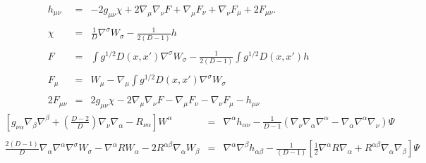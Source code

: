 \documentclass[10pt,letterpaper]{article}
\numberwithin{equation}{section}
\begin{document}
\begin{eqnarray}
h_{\mu\nu} &=& -2g_{\mu\nu}\chi + 2\nabla_\mu\nabla_\nu F + \nabla_\mu F_\nu + \nabla_\nu F_\mu + 2F_{\mu\nu}.
\\ \nonumber\\
\chi &=& \frac{1}{D}\nabla^\sigma W_{\sigma}  - \frac{1}{2(D-1)}h
\\ \nonumber\\
F &=& \int g^{1/2} D(x,x') \nabla^\sigma W_{\sigma}  - \frac{1}{2(D-1)}\int g^{1/2} D(x,x') h
\\ \nonumber\\
F_{\mu} &=& W_{\mu} -\nabla_\mu \int g^{1/2} D(x,x')\nabla^{\sigma}W_\sigma
\\ \nonumber\\
2F_{\mu\nu} &=& 2g_{\mu\nu}\chi - 2\nabla_\mu\nabla_\nu F - \nabla_\mu F_\nu - \nabla_\nu F_{\mu} - h_{\mu\nu} 
\end{eqnarray}
\begin{eqnarray}
\left[g_{\nu\alpha}\nabla_\beta\nabla^\beta + \left(\frac{D-2}{D}\right)\nabla_\nu \nabla_\alpha - R_{\nu\alpha}\right]W^\alpha &=&
\nabla^\alpha h_{\alpha\nu} - \frac{1}{D-1}\left(\nabla_\nu \nabla_\alpha\nabla^\alpha - \nabla_\alpha\nabla^\alpha \nabla_\nu\right)
\Psi
\\\nonumber \\
\frac{2(D-1)}{D}\nabla_\alpha\nabla^\alpha \nabla^\sigma W_\sigma - \nabla^\alpha R W_\alpha - 2R^{\alpha\beta} \nabla_\alpha W_{\beta} &=& 
\nabla^\alpha\nabla^\beta h_{\alpha\beta} - \frac{1}{(D-1)}\left[ \tfrac12 \nabla^\alpha R \nabla_\alpha + R^{\alpha\beta}\nabla_\alpha\nabla_\beta\right]\Psi
\end{eqnarray}
%
%

\end{document}
